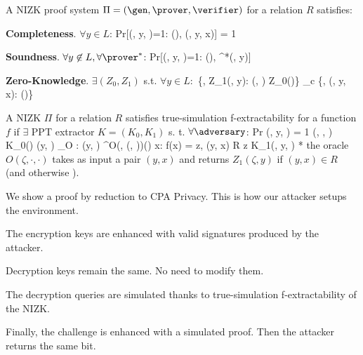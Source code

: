 \startslide[title={NIZK: a formal definition}]
A NIZK proof system $\Pi = (\gen, \prover, \verifier)$ for a relation $R$ satisfies:
\item {\bf Completeness}. $\forall y \in L$:
\startformula
Pr[\verifier(\omega, y, \pi)=1: \omega \sample \gen(\secparam), \pi \sample \prover(\omega, y, x)] = 1
\stopformula
\item {\bf Soundness}. $\forall y \not\in L, \forall \prover^*$:
\startformula
Pr[\verifier(\omega, y, \pi)=1: \omega \sample \gen(\secparam), \pi \sample \prover^*(\omega, y)] \in \negl
\stopformula
\item {\bf Zero-Knowledge}. $\exists (Z_0, Z_1)$ s.t. $\forall y \in L:$
\startformula
\{\omega, Z_1(\zeta, y): (\omega, \zeta) \sample Z_0(\secparam)\}
\stopformula
\startformula
\approx_c
\stopformula
\startformula
\{\omega, \prover(\omega, y, x): \omega \sample \gen(\secparam)\}
\stopformula
\stopitemize
\stopslide

\startslide[title={True-Simulation Extractability}]
A NIZK $\Pi$ for a relation $R$ satisfies true-simulation f-extractability for a function $f$ if $\exists$ PPT extractor $K = (K_0,K_1)$ s. t. $\forall \adversary$:
\startformula
Pr
\startmatrix[left={\left[\,},right={\,\right]}]
\NC \ver(\omega, y, \pi) = 1 \;\land \NC \NC (\omega, \zeta, \xi) \sample K_0(\secparam) \;\land \NR
\NC (y, \pi) \not\in{}_O \;\land \NC : \NC (y, \pi) \sample \adversary^{O(\zeta, (\cdot, \cdot))}(\omega) \;\land \NR
\NC \forall x: f(x) = z, (y, x) \not \in R \NC \NC z \sample K_1(\xi, y, \pi) \NR
\stopmatrix
\stopformula
* the oracle $O(\zeta, \cdot, \cdot)$ takes as input a pair $(y, x)$ and returns $Z_1(\zeta, y)$ if $(y, x) \in R$ (and otherwise \bot).
\stopslide

\startslide[title={CCA Privacy Proof (1/5)}]
We show a proof by reduction to CPA Privacy. This is how our attacker setups the environment.
\bigskip
{}
\stopslide

\startslide[title={CCA Privacy Proof (2/5)}]
The encryption keys are enhanced with valid signatures produced by the attacker.
\bigskip
{}
\stopslide

\startslide[title={CCA Privacy Proof (3/5)}]
Decryption keys remain the same. No need to modify them.
\bigskip
{}
\stopslide

\startslide[title={CCA Privacy Proof (4/5)}]
The decryption queries are simulated thanks to true-simulation f-extractability of the NIZK.
\bigskip
{}
\stopslide

\startslide[title={CCA Privacy Proof (5/5)}]
Finally, the challenge is enhanced with a simulated proof. Then the attacker returns the same bit.
\bigskip
{}
\stopslide
\stoptext
